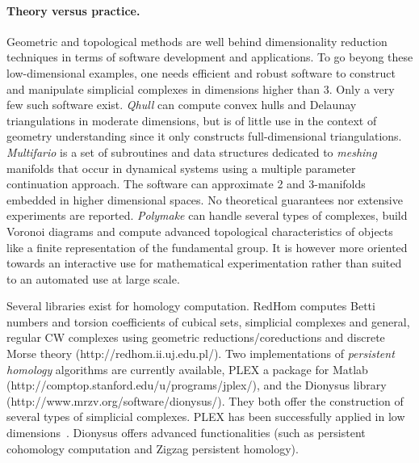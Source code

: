 \paragraph{Theory versus practice.} 
Geometric and topological methods are well behind dimensionality reduction techniques in terms of 
software development and applications.  
%
%
To go beyong these low-dimensional examples, one needs efficient and robust software to construct and manipulate simplicial complexes in dimensions higher than 3.  Only a very few such software exist.  {\em Qhull} can compute convex hulls and Delaunay triangulations in moderate dimensions, but is of little use in the context of geometry understanding since it only constructs full-dimensional triangulations. {\em Multifario} is a set of subroutines and data structures dedicated to {\em meshing} manifolds that occur in dynamical systems using a multiple parameter continuation approach. The software can approximate 2 and 3-manifolds embedded in higher dimensional spaces. No theoretical guarantees nor extensive experiments are reported.  {\em Polymake} can handle several types of complexes, build Voronoi diagrams and compute advanced topological characteristics of objects like a finite representation of the fundamental group. It is however more oriented towards an interactive use for mathematical experimentation
rather than suited to an automated use at large scale.%

Several libraries exist for homology computation. RedHom computes Betti numbers and torsion coefficients of cubical sets, simplicial complexes and general, regular CW complexes using geometric reductions/coreductions and discrete Morse theory (http://redhom.ii.uj.edu.pl/).
Two implementations of {\em persistent homology} algorithms are currently available, PLEX a package for Matlab (http://comptop.stanford.edu/u/programs/jplex/), and  the Dionysus library (http://www.mrzv.org/software/dionysus/). They both offer the construction of several types of simplicial complexes. PLEX has been  successfully applied in low dimensions~\cite{fpgo-airc-2009,rg-bptd-2008,mtcw-tco-2010}. Dionysus offers advanced
functionalities (such as persistent cohomology computation and 
Zigzag persistent homology).
\vspace{2mm}

